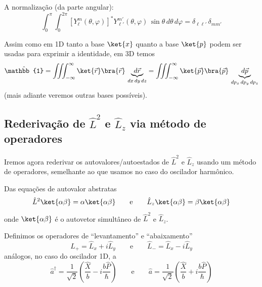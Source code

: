 A normalização (da parte angular):
\begin{equation}
    \int_0^\pi \int_0^{2\pi} \left[Y_\ell^m(\theta,\varphi)\right]^* Y_{\ell'}^{m'}(\theta,\varphi) \, \sin\theta \, d\theta \, d\varphi = \delta_{\ell\ell'}\,\delta_{mm'}
\label{eq:aula20_normalizacao_Ylm}
\end{equation}

Assim como em 1D tanto a base $\ket{x}$ quanto a base $\ket{p}$ podem ser usadas para exprimir a identidade, em 3D temos
\begin{equation}
    \hat{\mathbb{1}} = \iiint_{-\infty}^{\infty} \ket{\vec{r}}\bra{\vec{r}} \, \underbrace{d\vec{r}}_{dx\,dy\,dz} = \iiint_{-\infty}^{\infty} \ket{\vec{p}}\bra{\vec{p}} \, \underbrace{d\vec{p}}_{dp_x\,dp_y\,dp_z}
\label{eq:aula20_identidade_3D}
\end{equation}
(mais adiante veremos outras bases possíveis).

\subsection*{Rederivação de $\hat{L}^2$ e $\hat{L}_z$ via método de operadores}

Iremos agora rederivar os autovalores/autoestados de $\hat{L}^2$ e $\hat{L}_z$ usando um método de operadores, semelhante ao que usamos no caso do oscilador harmônico.

Das equações de autovalor abstratas
\begin{equation}
    \hat{L}^2 \ket{\alpha\beta} = \alpha \ket{\alpha\beta} \qquad \text{e} \qquad \hat{L}_z \ket{\alpha\beta} = \beta \ket{\alpha\beta}
\label{eq:aula20_autovalores_abstratos}
\end{equation}
onde $\ket{\alpha\beta}$ é o autovetor simultâneo de $\hat{L}^2$ e $\hat{L}_z$.

Definimos os operadores de ``levantamento'' e ``abaixamento''
\begin{equation}
    \hat{L}_+ = \hat{L}_x + i\hat{L}_y \qquad \text{e} \qquad \hat{L}_- = \hat{L}_x - i\hat{L}_y
\label{eq:aula20_def_Lmais_Lmenos}
\end{equation}
análogos, no caso do oscilador 1D, a
\begin{equation}
    \hat{a}^\dagger = \frac{1}{\sqrt{2}}\left(\frac{\hat{X}}{b} - i\frac{b\hat{P}}{\hbar}\right) \qquad \text{e} \qquad \hat{a} = \frac{1}{\sqrt{2}}\left(\frac{\hat{X}}{b} + i\frac{b\hat{P}}{\hbar}\right)
\label{eq:aula20_analogia_oscilador}
\end{equation}

